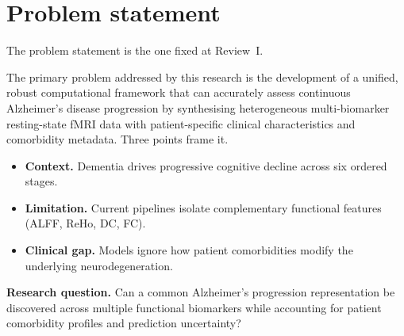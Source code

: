 \documentclass{ssnreview}
\begin{document}
\chapter{Problem statement}\label{ch:problem}

The problem statement is the one fixed at Review~I.

\medskip
\noindent{}

\medskip
\noindent The primary problem addressed by this research is the development of a unified,
robust computational framework that can accurately assess continuous Alzheimer's
disease progression by synthesising heterogeneous multi-biomarker resting-state fMRI
data with patient-specific clinical characteristics and comorbidity metadata. Three
points frame it.
\begin{itemize}[leftmargin=2em]
  \item \textbf{Context.} Dementia drives progressive cognitive decline across six
        ordered stages.
  \item \textbf{Limitation.} Current pipelines isolate complementary functional
        features (ALFF, ReHo, DC, FC).
  \item \textbf{Clinical gap.} Models ignore how patient comorbidities modify the
        underlying neurodegeneration.
\end{itemize}

\noindent\textbf{Research question.} Can a common Alzheimer's progression representation be
discovered across multiple functional biomarkers while accounting for patient
comorbidity profiles and prediction uncertainty?
\end{document}
